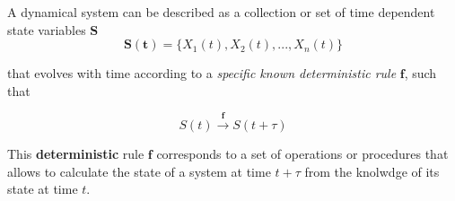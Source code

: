 \documentclass[10pt]{article}
\begin{document}
    \begin{definition}
      A dynamical system can be described as a collection or set of time dependent state variables $\mathbf{S}$
      $$\mathbf{S(t)} = \{ X_1(t), X_2(t), ..., X_n(t) \}$$
      
      that evolves with time according to a \textit{specific known deterministic rule} $\mathbf{f}$, such that
      
      $$S(t) \xrightarrow{\mathbf{f}} S(t + \tau)$$
    \end{definition}
    This \textbf{deterministic} rule $\mathbf{f}$ corresponds to a set of operations or procedures that allows to calculate the state
    of a system at time $t + \tau$ from the knolwdge of its state at time $t$.




  



  
\end{document}
